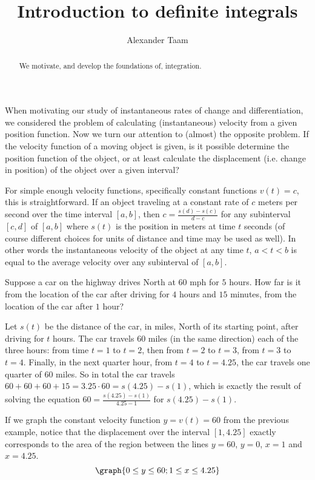 \documentclass{ximera}
\title{Introduction to definite integrals}
\author{Alexander Taam}
\begin{document}
\begin{abstract}
  We motivate, and develop the foundations of, integration.
\end{abstract}
\maketitle

When motivating our study of instantaneous rates of change and differentiation, we considered the problem of calculating (instantaneous) velocity from a given position function. Now we turn our attention to (almost) the opposite problem. If the velocity function of a moving object is given, is it possible determine the position function of the object, or at least calculate the displacement (i.e. change in position) of the object over a given interval?

For simple enough velocity functions, specifically constant functions $v(t)=c$, this is straightforward. If an object traveling at a constant rate of $c$ meters per second over the time interval $[a,b]$, then $c=\frac{s(d)-s(c)}{d-c}$ for any subinterval $[c,d]$ of $[a,b]$ where $s(t)$ is the position in meters at time $t$ seconds (of course different choices for units of distance and time may be used as well). In other words the instantaneous velocity of the object at any time $t$, $a<t<b$ is equal to the average velocity over any subinterval of $[a,b]$.

\begin{example}
Suppose a car on the highway drives North at $60$ mph for $5$ hours. How far is it from the location of the car after driving for $4$ hours and $15$ minutes, from the location of the car after $1$ hour?

\begin{explanation} Let $s(t)$ be the distance of the car, in miles, North of its starting point, after driving for $t$ hours. The car travels $60$ miles (in the same direction) each of the three hours: from time $t=1$ to $t=2$, then from $t=2$ to $t=3$, from $t=3$ to $t=4$. Finally, in the next quarter hour, from $t=4$ to $t=4.25$, the car travels one quarter of $60$ miles. So in total the car travels $60+60+60+15=3.25\cdot60=s(4.25)-s(1)$, which is exactly the result of solving the equation $60=\frac{s(4.25)-s(1)}{4.25-1}$ for $s(4.25)-s(1)$.
\end{explanation}
\end{example}

If we graph the constant velocity function $y=v(t)=60$ from the previous example, notice that the displacement over the interval $[1,4.25]$ exactly corresponds to the area of the region between the lines $y=60$, $y=0$, $x=1$ and $x=4.25$.
\[
\graph{0\leq y\leq 60;1\leq x\leq 4.25}
\]
\end{document}
